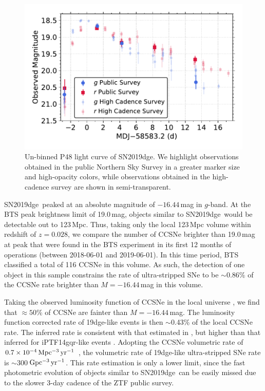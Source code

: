 \documentclass[twocolumn]{aastex63}
\newcommand{\name}{SN2019dge}
\begin{document}
\begin{figure}[htbp!]
	\centering
	\includegraphics[width=\columnwidth]{figures/lc_programids.pdf}
	\caption{Un-binned P48 light curve of \name. We highlight observations obtained in the public 
	Northern Sky Survey in a greater marker size and high-opacity colors, while observations obtained in 
	the high-cadence survey are shown in semi-transparent.
		\label{fig:lc_pid}}
\end{figure}

\name\ peaked at an absolute magnitude of $-16.44$\,mag in $g$-band.
At the BTS peak brightness limit of 19.0\,mag, objects similar to \name\ would be detectable 
out to 123\,Mpc. Thus, taking only the local 123\,Mpc volume within redshift of $z = 0.028$, we 
compare the number of CCSNe brighter than 19.0\,mag at peak that were found in the BTS experiment 
in its first 12 months of operations (between 2018-06-01 and 2019-06-01). In this time period, BTS 
classified a total of 116 CCSNe in this volume. As such, the detection of one object in this sample 
constrains the rate of ultra-stripped SNe to be $\sim$0.86\% of the CCSNe rate brighter than $M = 
-16.44$\,mag in this volume. 

Taking the observed luminosity function of CCSNe in the local universe \citep{Li2011b}, we find that 
$\approx 50$\% of CCSNe are fainter than $M = -16.44$\,mag. The 
luminosity function corrected rate of 19dge-like events is then $\sim$0.43\% of the local CCSNe rate. 
The inferred rate is consistent with that estimated in 
\citet{Tauris2015}, but higher than that inferred for iPTF14gqr-like events \citep{Hijikawa2019}. 
Adopting the CCSNe volumetric rate of $0.7 \times 10^{-4}\,{\rm Mpc^{-3}\, yr^{-1}}$
\citep{Li2011a}, the volumetric rate of 19dge-like ultra-stripped SNe rate is $\sim$300\,${\rm Gpc^{-3}\, 
yr^{-1}}$. This rate estimation is only a lower limit, since the fast photometric evolution of objects 
similar to \name\ can be easily missed due to the slower 3-day cadence of the ZTF public survey.
\end{document}
